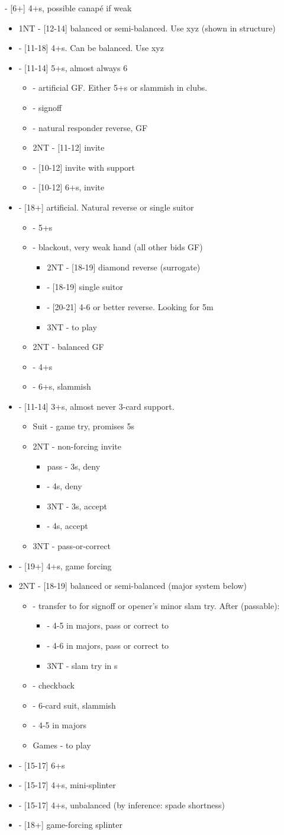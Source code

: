 \documentclass[12pt]{report}
\newcommand{\ul}[1]{\begin{itemize}#1\end{itemize}}
\newcommand{\li}{\item[~]}
\begin{document}
{        \li {} - [6+] 4+\he{}s, possible \di{} canapé if weak
        \ul {
            \li 1NT - [12-14] balanced or semi-balanced.  Use xyz (shown in \di1 structure)
            \li \sp1 - [11-18] 4+\sp{}s.  Can be balanced.  Use xyz
            \li \cl2 - [11-14] 5+\cl{}s, almost always 6
            \ul {
                \li \di2 - artificial GF.  Either 5+\he{}s or slammish in clubs.
                \li \he2 - signoff
                \li \sp2 - natural responder reverse, GF
                \li 2NT - [11-12] invite
                \li \cl3 - [10-12] invite with support
                \li \he3 - [10-12] 6+\he{}s, invite
            }
            \li \di2 - [18+] artificial.  Natural \di{} reverse or single suitor
            \ul {
                \li \he2 - 5+\he{}s
                \li \sp2 - blackout, very weak hand (all other bids GF)
                \ul {
                    \li 2NT - [18-19] diamond reverse (surrogate)
                    \li \cl3 - [18-19] single suitor
                    \li \di3 - [20-21] 4-6 or better reverse.  Looking for 5m
                    \li 3NT - to play
                }
                \li 2NT - balanced GF
                \li \cl3 - 4+\cl{}s
                \li \he3 - 6+\he{}s, slammish
            }
            \li \he2 - [11-14] 3+\he{}s, almost never 3-card support.
            \ul {
                \li Suit - game try, promises 5\he{}s
                \li 2NT - non-forcing invite
                \ul {
                    \li pass - 3\he{}s, deny
                    \li \he3 - 4\he{}s, deny
                    \li 3NT - 3\he{}s, accept
                    \li \he4 - 4\he{}s, accept
                }
                \li 3NT - pass-or-correct
            }
            \li \sp2 - [19+] 4+\sp{}s, game forcing
            \li 2NT - [18-19] balanced or semi-balanced (major system below)
            \ul {
                \li \cl3 - transfer to \di{3} for signoff or opener's minor slam try.  After \di3 (passable):
                \ul {
                    \li \he3 - 4-5 in majors, pass or correct to \sp3
                    \li \sp3 - 4-6 in majors, pass or correct to \he4
                    \li 3NT - slam try in \cl{}s
                }
                \li \di3 - checkback
                \li \he3 - 6-card suit, slammish
                \li \sp3 - 4-5 in majors
                \li Games - to play
            }
            \li \cl3 - [15-17] 6+\cl{}s
            \li \di3 - [15-17] 4+\he{}s, mini-splinter
            \li \he3 - [15-17] 4+\he{}s, unbalanced (by inference: spade shortness)
            \li \sp3 - [18+] game-forcing splinter
}}
\end{document}
